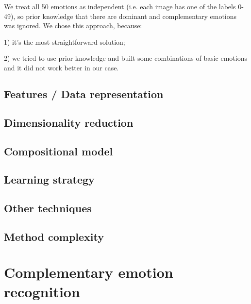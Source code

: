 \documentclass{article}
\begin{document}
We treat all 50 emotions as independent (i.e. each image has one of the labels 0-49), so prior knowledge that there are dominant and complementary emotions was ignored.
We chose this approach, because: 

1) it's the most straightforward solution;

2) we tried to use prior knowledge and built some combinations of basic emotions and it did not work better in our case.

\subsection{Features / Data representation}

\subsection{Dimensionality reduction}

\subsection{Compositional model}

\subsection{Learning strategy}

\subsection{Other techniques}

\subsection{Method complexity}


\section{Complementary emotion recognition}
\end{document}

